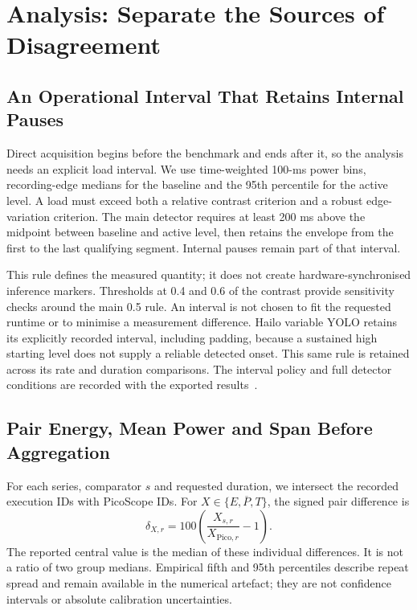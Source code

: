 \section{Analysis: Separate the Sources of Disagreement}
\label{sec:methods}
\subsection{An Operational Interval That Retains Internal Pauses}
Direct acquisition begins before the benchmark and ends after it, so the analysis needs an explicit load interval. We use time-weighted 100-ms power bins, recording-edge medians for the baseline and the 95th percentile for the active level. A load must exceed both a relative contrast criterion and a robust edge-variation criterion. The main detector requires at least 200 ms above the midpoint between baseline and active level, then retains the envelope from the first to the last qualifying segment. Internal pauses remain part of that interval.

This rule defines the measured quantity; it does not create hardware-synchronised inference markers. Thresholds at 0.4 and 0.6 of the contrast provide sensitivity checks around the main 0.5 rule. An interval is not chosen to fit the requested runtime or to minimise a measurement difference. Hailo variable YOLO retains its explicitly recorded interval, including padding, because a sustained high starting level does not supply a reliable detected onset. This same rule is retained across its rate and duration comparisons. The interval policy and full detector conditions are recorded with the exported results~\cite{energyResults2026}.

\subsection{Pair Energy, Mean Power and Span Before Aggregation}
For each series, comparator $s$ and requested duration, we intersect the recorded execution IDs with PicoScope IDs. For $X\in\{E,\overline P,T\}$, the signed pair difference is
\begin{equation}
\delta_{X,r}=100\left(\frac{X_{s,r}}{X_{\mathrm{Pico},r}}-1\right).
\label{eq:paired}
\end{equation}
The reported central value is the median of these individual differences. It is not a ratio of two group medians. Empirical fifth and 95th percentiles describe repeat spread and remain available in the numerical artefact; they are not confidence intervals or absolute calibration uncertainties.

